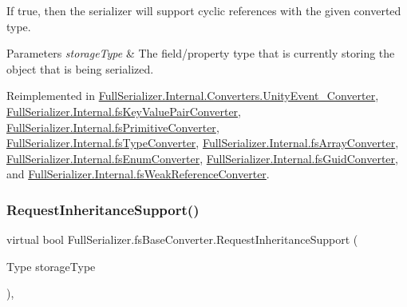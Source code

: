 If true, then the serializer will support cyclic references with the given converted type. 


\begin{DoxyParams}{Parameters}
{\em storage\+Type} & The field/property type that is currently storing the object that is being serialized.\\
\hline
\end{DoxyParams}


Reimplemented in \hyperlink{class_full_serializer_1_1_internal_1_1_converters_1_1_unity_event___converter_af4489bd5a993a32021e1ab24fcd6a42f}{Full\+Serializer.\+Internal.\+Converters.\+Unity\+Event\+\_\+\+Converter}, \hyperlink{class_full_serializer_1_1_internal_1_1fs_key_value_pair_converter_a0a18762f776b7e00ab59d7827d3e50cc}{Full\+Serializer.\+Internal.\+fs\+Key\+Value\+Pair\+Converter}, \hyperlink{class_full_serializer_1_1_internal_1_1fs_primitive_converter_a69a650703493e76171dff70be6ebec7c}{Full\+Serializer.\+Internal.\+fs\+Primitive\+Converter}, \hyperlink{class_full_serializer_1_1_internal_1_1fs_type_converter_a60f6421c5356bcf6954d3c888bbaf860}{Full\+Serializer.\+Internal.\+fs\+Type\+Converter}, \hyperlink{class_full_serializer_1_1_internal_1_1fs_array_converter_a491c874399362934670610d5f232d6e6}{Full\+Serializer.\+Internal.\+fs\+Array\+Converter}, \hyperlink{class_full_serializer_1_1_internal_1_1fs_enum_converter_a9f297d3fbac4eecd05de362227a1161e}{Full\+Serializer.\+Internal.\+fs\+Enum\+Converter}, \hyperlink{class_full_serializer_1_1_internal_1_1fs_guid_converter_aaeaf4b6d5206b2b70f0d9d2d79a5efe7}{Full\+Serializer.\+Internal.\+fs\+Guid\+Converter}, and \hyperlink{class_full_serializer_1_1_internal_1_1fs_weak_reference_converter_a917bdcf70205871ef02577d31b3216f3}{Full\+Serializer.\+Internal.\+fs\+Weak\+Reference\+Converter}.

\mbox{\label{class_full_serializer_1_1fs_base_converter_a84447285540ab6b51efc2399d144c60c}} 
\subsubsection{\texorpdfstring{Request\+Inheritance\+Support()}{RequestInheritanceSupport()}}
{\footnotesize\ttfamily virtual bool Full\+Serializer.\+fs\+Base\+Converter.\+Request\+Inheritance\+Support (\begin{DoxyParamCaption}\item[{Type}]{storage\+Type }\end{DoxyParamCaption})\hspace{0.3cm}{\ttfamily [inline]}, {\ttfamily [virtual]}}



